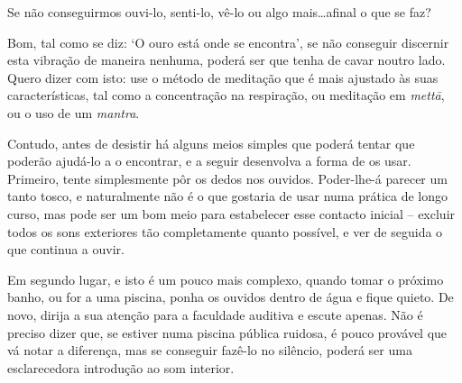 \smallskip

 Se não conseguirmos ouvi-lo, senti-lo, vê-lo ou algo
mais\ldots{}afinal o que se faz?

 Bom, tal como se diz: `O ouro está onde se encontra', se não
conseguir discernir esta vibração de maneira nenhuma, poderá ser que
tenha de cavar noutro lado. Quero dizer com isto: use o método de
meditação que é mais ajustado às suas características, tal como a
concentração na respiração, ou meditação em \emph{mettā}, ou o uso de um
\emph{mantra}.

Contudo, antes de desistir há alguns meios simples que poderá tentar que
poderão ajudá-lo a o encontrar, e a seguir desenvolva a forma de os
usar. Primeiro, tente simplesmente pôr os dedos nos ouvidos. Poder-lhe-á
parecer um tanto tosco, e naturalmente não é o que gostaria de usar numa
prática de longo curso, mas pode ser um bom meio para estabelecer esse
contacto inicial -- excluir todos os sons exteriores tão completamente
quanto possível, e ver de seguida o que continua a ouvir.

Em segundo lugar, e isto é um pouco mais complexo, quando tomar o
próximo banho, ou for a uma piscina, ponha os ouvidos dentro de água e
fique quieto. De novo, dirija a sua atenção para a faculdade auditiva e
escute apenas. Não é preciso dizer que, se estiver numa piscina pública
ruidosa, é pouco provável que vá notar a diferença, mas se conseguir
fazê-lo no silêncio, poderá ser uma esclarecedora introdução ao som
interior.

